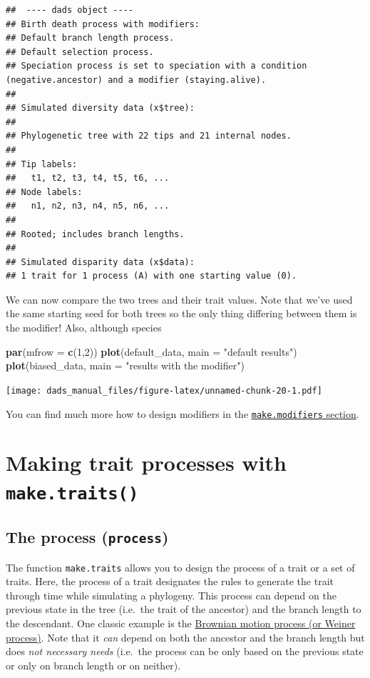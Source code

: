\documentclass[]{book}
\newenvironment{Shaded}{\begin{snugshade}}{\end{snugshade}}
\newcommand{\DataTypeTok}[1]{\textcolor[rgb]{0.13,0.29,0.53}{#1}}
\newcommand{\DecValTok}[1]{\textcolor[rgb]{0.00,0.00,0.81}{#1}}
\newcommand{\KeywordTok}[1]{\textcolor[rgb]{0.13,0.29,0.53}{\textbf{#1}}}
\newcommand{\NormalTok}[1]{#1}
\newcommand{\StringTok}[1]{\textcolor[rgb]{0.31,0.60,0.02}{#1}}
\begin{document}
\begin{verbatim}
##  ---- dads object ---- 
## Birth death process with modifiers:
## Default branch length process.
## Default selection process.
## Speciation process is set to speciation with a condition (negative.ancestor) and a modifier (staying.alive).
## 
## Simulated diversity data (x$tree):
## 
## Phylogenetic tree with 22 tips and 21 internal nodes.
## 
## Tip labels:
##   t1, t2, t3, t4, t5, t6, ...
## Node labels:
##   n1, n2, n3, n4, n5, n6, ...
## 
## Rooted; includes branch lengths.
## 
## Simulated disparity data (x$data):
## 1 trait for 1 process (A) with one starting value (0).
\end{verbatim}

We can now compare the two trees and their trait values.
Note that we've used the same starting seed for both trees so the only thing differing between them is the modifier!
Also, although species

\begin{Shaded}
\begin{Highlighting}[]
\KeywordTok{par}\NormalTok{(}\DataTypeTok{mfrow =} \KeywordTok{c}\NormalTok{(}\DecValTok{1}\NormalTok{,}\DecValTok{2}\NormalTok{))}
\KeywordTok{plot}\NormalTok{(default_data, }\DataTypeTok{main =} \StringTok{"default results"}\NormalTok{)}
\KeywordTok{plot}\NormalTok{(biased_data, }\DataTypeTok{main =} \StringTok{"results with the modifier"}\NormalTok{)}
\end{Highlighting}
\end{Shaded}

\texttt{[image: dads\_manual\_files/figure-latex/unnamed-chunk-20-1.pdf]}

You can find much more how to design modifiers in the \protect\hyperlink{makemodifiers}{\texttt{make.modifiers} section}.

\hypertarget{maketraits}{%
\chapter{\texorpdfstring{Making trait processes with \texttt{make.traits()}}{Making trait processes with make.traits()}}\label{maketraits}}

\hypertarget{the-process-process}{%
\section{\texorpdfstring{The process (\texttt{process})}{The process (process)}}\label{the-process-process}}

The function \texttt{make.traits} allows you to design the process of a trait or a set of traits.
Here, the process of a trait designates the rules to generate the trait through time while simulating a phylogeny.
This process can depend on the previous state in the tree (i.e.~the trait of the ancestor) and the branch length to the descendant.
One classic example is the \href{https://en.wikipedia.org/wiki/Brownian_motion}{Brownian motion process (or Weiner process)}.
Note that it \emph{can} depend on both the ancestor and the branch length but does \emph{not necessary needs} (i.e.~the process can be only based on the previous state or only on branch length or on neither).
\end{document}
